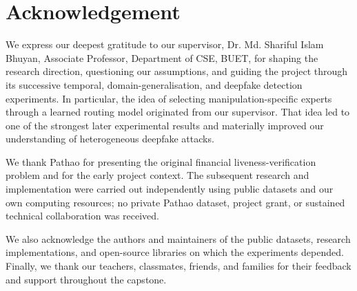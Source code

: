 \chapter*{Acknowledgement}

We express our deepest gratitude to our supervisor, Dr. Md. Shariful Islam
Bhuyan, Associate Professor, Department of CSE, BUET, for
shaping the research direction, questioning our assumptions, and guiding the
project through its successive temporal, domain-generalisation, and deepfake
detection experiments. In particular, the idea of selecting manipulation-specific
experts through a learned routing model originated from our supervisor. That idea
led to one of the strongest later experimental results and materially improved
our understanding of heterogeneous deepfake attacks.

We thank Pathao for presenting the original financial liveness-verification
problem and for the early project context. The subsequent research and
implementation were carried out independently using public datasets and our own
computing resources; no private Pathao dataset, project grant, or sustained
technical collaboration was received.

We also acknowledge the authors and maintainers of the public datasets, research
implementations, and open-source libraries on which the experiments depended.
Finally, we thank our teachers, classmates, friends, and families for their
feedback and support throughout the capstone.

\clearpage

